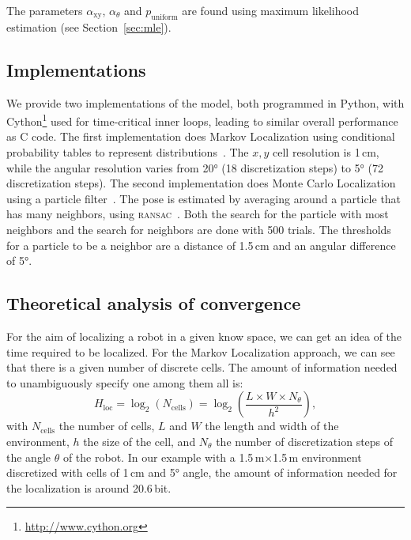 \documentclass[letterpaper, 10pt, conference]{ieeeconf}
\newcommand{\sect}[1]{Section~\ref{sec:#1}}
\begin{document}
The parameters $\alpha_\mathrm{xy}$, $\alpha_\theta$ and $p_\mathrm{uniform}$ are found using maximum likelihood estimation (see \sect{mle}).

\subsection{Implementations}

We provide two implementations of the model, both programmed in Python, with Cython\footnote{\url{http://www.cython.org}} used for time-critical inner loops, leading to similar overall performance as C code.
The first implementation does Markov Localization using conditional probability tables to represent distributions~\cite{fox1999markov}.
The $x,y$ cell resolution is 1\,cm, while the angular resolution varies from 20° (18 discretization steps) to 5° (72 discretization steps).
The second implementation does Monte Carlo Localization using a particle filter~\cite{dellaert1999monte}.
The pose is estimated by averaging around a particle that has many neighbors, using \textsc{ransac}~\cite{Fischler1981ransac}.
Both the search for the particle with most neighbors and the search for neighbors are done with 500 trials.
The thresholds for a particle to be a neighbor are a distance of 1.5\,cm and an angular difference of 5°.

\subsection{Theoretical analysis of convergence}
\label{sec:theoreticalconv}

For the aim of localizing a robot in a given know space, we can get an idea of the time required to be localized.
For the Markov Localization approach, we can see that there is a given number of discrete cells.
The amount of information needed to unambiguously specify one among them all is:
\begin{displaymath}
	H_\mathrm{loc} = \log_2(N_\mathrm{cells}) = \log_2\left(\frac{L\times W\times N_{\theta}}{h^2}\right),
\end{displaymath}
with $N_\mathrm{cells}$ the number of cells, $L$ and $W$ the length and width of the environment, $h$ the size of the cell, and $N_{\theta}$ the number of discretization steps of the angle $\theta$ of the robot.
In our example with a 1.5\,m$\times$1.5\,m environment discretized with cells of 1\,cm and 5° angle, the amount of information needed for the localization is around 20.6\,bit.
\end{document}
